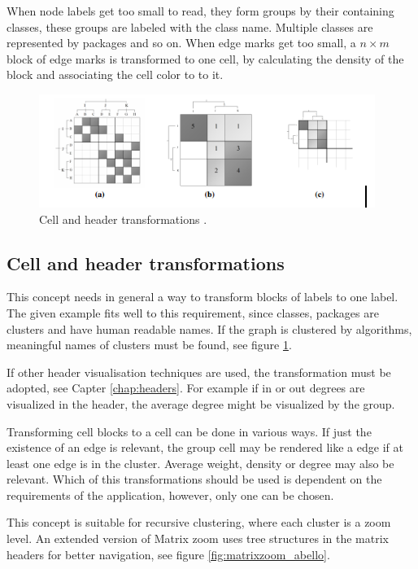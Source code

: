 When node labels get too small to read, they form groups by their containing classes, these groups are labeled with the class name. Multiple classes are represented by packages and so on. When edge marks get too small, a $n \times m$ block of edge marks is transformed to one cell, by calculating the density of the block and associating the cell color to to it.

\begin{figure}[h]
\centering
\includegraphics{images/matrixzoom_transform}
\caption{Cell and header transformations \citep{ham-ivis-2003}. \label{fig:matrixzoom_transform}}
\end{figure}




\subsection{Cell and header transformations}   
This concept needs in general a way to transform blocks of labels to one label. The given example fits well to this requirement, since classes, packages are clusters and have human readable names. If the graph is clustered by algorithms, meaningful names of clusters must be found, see figure \ref{fig:matrixzoom_transform}.

If other header visualisation techniques are used, the transformation must be adopted, see Capter \ref{chap:headers}. For example if in or out degrees are visualized in the header, the average degree might be visualized by the group.

Transforming cell blocks to a cell can be done in various ways. If just the existence of an edge is relevant, the group cell may be rendered like a edge if at least one edge is in the cluster. Average weight, density or degree may also be relevant. Which of this transformations should be used is dependent on the requirements of the application, however, only one can be chosen.

This concept is suitable for recursive clustering, where each cluster is a zoom level. An extended version of Matrix zoom  \citep{abello2004} uses tree structures in the matrix headers for better navigation, see figure \ref{fig:matrixzoom_abello}.

